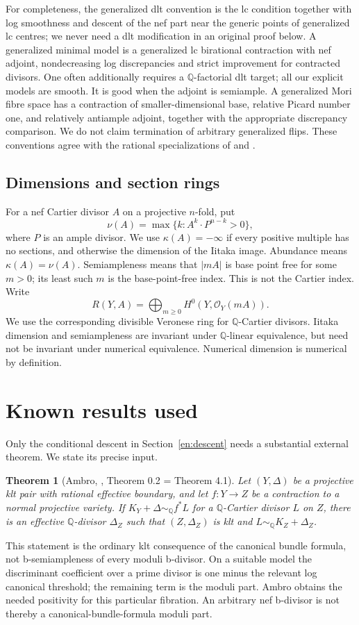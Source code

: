 \documentclass[12pt]{amsart}
\newtheorem{thm}{Theorem}[section]
\theoremstyle{definition}
\theoremstyle{remark}
\numberwithin{equation}{section}
\newcommand{\cO}{\mathcal{O}}
\newcommand{\Q}{\mathbb{Q}}
\newcommand{\qs}{\sim_{\mathbb Q}}
\begin{document}
For completeness, the generalized dlt convention is the lc condition together with log smoothness and descent of the nef part near the generic points of generalized lc centres; we never need a dlt modification in an original proof below. A generalized minimal model is a generalized lc birational contraction with nef adjoint, nondecreasing log discrepancies and strict improvement for contracted divisors. One often additionally requires a $\Q$-factorial dlt target; all our explicit models are smooth. It is good when the adjoint is semiample. A generalized Mori fibre space has a contraction of smaller-dimensional base, relative Picard number one, and relatively antiample adjoint, together with the appropriate discrepancy comparison. We do not claim termination of arbitrary generalized flips. These conventions agree with the rational specializations of \cite[\S2]{en-HL} and \cite[\S2]{en-TX}.

\subsection{Dimensions and section rings}
For a nef Cartier divisor $A$ on a projective $n$-fold, put
\[
 \nu(A)=\max\{k:A^k\cdot P^{n-k}>0\},
\]
where $P$ is an ample divisor. We use $\kappa(A)=-\infty$ if every positive multiple has no sections, and otherwise the dimension of the Iitaka image. Abundance means $\kappa(A)=\nu(A)$. Semiampleness means that $|mA|$ is base point free for some $m>0$; its least such $m$ is the base-point-free index. This is not the Cartier index. Write
\[
 R(Y,A)=\bigoplus_{m\geq0}H^0(Y,\cO_Y(mA)).
\]
We use the corresponding divisible Veronese ring for $\Q$-Cartier divisors. Iitaka dimension and semiampleness are invariant under $\Q$-linear equivalence, but need not be invariant under numerical equivalence. Numerical dimension is numerical by definition.

\section{Known results used}\label{en:known}
Only the conditional descent in Section~\ref{en:descent} needs a substantial external theorem. We state its precise input.

\begin{thm}[Ambro, \cite{en-Amb}, Theorem 0.2 = Theorem 4.1]\label{en:ambro}
Let $(Y,\Delta)$ be a projective klt pair with rational effective boundary, and let $f:Y\to Z$ be a contraction to a normal projective variety. If $K_Y+\Delta\qs f^*L$ for a $\Q$-Cartier divisor $L$ on $Z$, there is an effective $\Q$-divisor $\Delta_Z$ such that $(Z,\Delta_Z)$ is klt and $L\qs K_Z+\Delta_Z$.
\end{thm}
This statement is the ordinary klt consequence of the canonical bundle formula, not b-semiampleness of every moduli b-divisor. On a suitable model the discriminant coefficient over a prime divisor is one minus the relevant log canonical threshold; the remaining term is the moduli part. Ambro obtains the needed positivity for this particular fibration. An arbitrary nef b-divisor is not thereby a canonical-bundle-formula moduli part.
\end{document}
